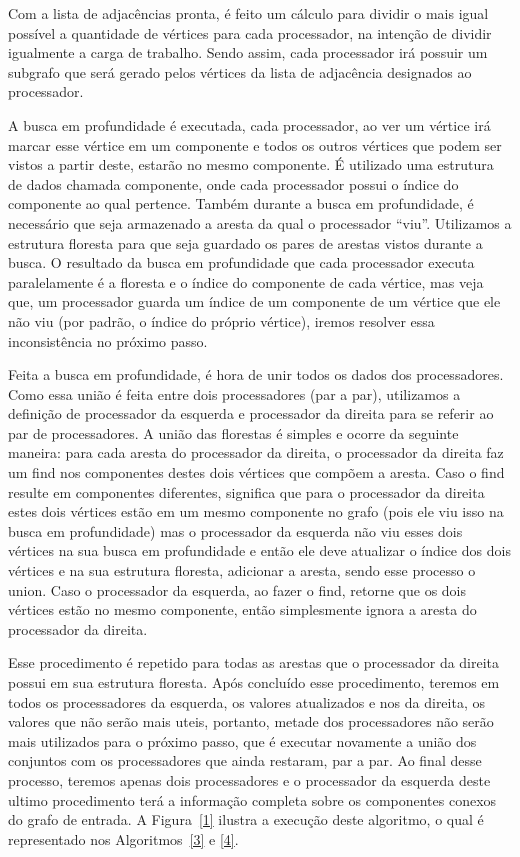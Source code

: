 \documentclass[12pt]{article}
\begin{document}
Com a lista de adjacências pronta, é feito um cálculo para dividir o mais igual possível a quantidade de vértices para cada processador, na intenção de dividir igualmente a carga de trabalho. Sendo assim, cada processador irá possuir um subgrafo que será gerado pelos vértices da lista de adjacência designados ao processador.
 
A busca em profundidade é executada, cada processador, ao ver um vértice irá marcar esse vértice em um componente e todos os outros vértices que podem ser vistos a partir deste, estarão no mesmo componente. É utilizado uma estrutura de dados chamada componente, onde cada processador possui o índice do componente ao qual pertence. Também durante a busca em profundidade, é necessário que seja armazenado a aresta da qual o processador ``viu''. Utilizamos a estrutura floresta para que seja guardado os pares de arestas vistos durante a busca. O resultado da busca em profundidade que cada processador executa paralelamente é a floresta e o índice do componente de cada vértice, mas veja que, um processador guarda um índice de um componente de um vértice que ele não viu (por padrão, o índice do próprio vértice), iremos resolver essa inconsistência no próximo passo.
 
Feita a busca em profundidade, é hora de unir todos os dados dos processadores. Como essa união é feita entre dois processadores (par a par), utilizamos a definição de processador da esquerda e processador da direita para se referir ao par de processadores. A união das florestas é simples e ocorre da seguinte maneira: para cada aresta do processador da direita, o processador da direita faz um find nos componentes destes dois vértices que compõem a aresta. Caso o find resulte em componentes diferentes, significa que para o processador da direita estes dois vértices estão em um mesmo componente no grafo (pois ele viu isso na busca em profundidade) mas o processador da esquerda não viu esses dois vértices na sua busca em profundidade e então ele deve atualizar o índice dos dois vértices e na sua estrutura floresta, adicionar a aresta, sendo esse processo o union. Caso o processador da esquerda, ao fazer o find, retorne que os dois vértices estão no mesmo componente, então simplesmente ignora a aresta do processador da direita.
 
Esse procedimento é repetido para todas as arestas que o processador da direita possui em sua estrutura floresta. Após concluído esse procedimento, teremos em todos os processadores da esquerda, os valores atualizados e nos da direita, os valores que não serão mais uteis, portanto, metade dos processadores não serão mais utilizados para o próximo passo, que é executar novamente a união dos conjuntos com os processadores que ainda restaram, par a par. Ao final desse processo, teremos apenas dois processadores e o processador da esquerda deste ultimo procedimento terá a informação completa sobre os componentes conexos do grafo de entrada. A Figura~\ref{1} ilustra a execução deste algoritmo, o qual é representado nos Algoritmos~\ref{3} e \ref{4}.
\end{document}
